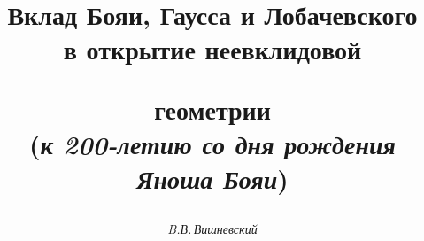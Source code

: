 




%





\newcommand{\trivert}{|@!@!@!|@!@!@!|}%


\newcommand{\tts}[1]{}


\renewcommand{\baselinestretch}{1.03}







\setcounter{page}{3}










\udk{}





\author{\it B.В.\,Вишневский}




\title{Вклад Бояи, Гаусса и Лобачевского\\ в открытие неевклидовой


геометрии\\ ({\it к 200-летию со дня рождения Яноша Бояи})}





\date{}




\pagestyle{plain} %







\maketitle


